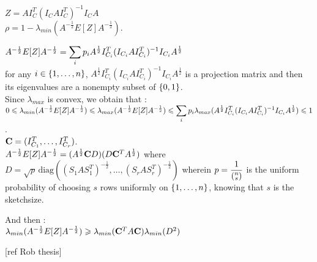 $Z = A I_{C}^{T} (I_{C} A I_{C}^{T})^{-1} I_{C} A$\\

$\rho = 1 - \lambda_{min}(A^{-\frac12}E[Z]A^{-\frac12}  )$.

$A^{-\frac12}E[Z]A^{-\frac12} = \dsp\sum\limits_{i} p_{i} A^{\frac 12} I_{C_{i}}^{T} (I_{C_{i}}  A  I_{C_{i}}^{T})^{-1} I_{C_{i}} A^{\frac 12}$ \\

for any $i \in \acco{1,\dots,n}$, $A^{\frac 12} I_{C_{i}}^{T} (I_{C_{i}}  A  I_{C_{i}}^{T})^{-1} I_{C_{i}} A^{\frac 12}$ is a projection matrix and then its eigenvalues are a nonempty subset of $\acco{0,1}$.\\

Since $\lambda_{max}$ is convex, we obtain that :\\

$0 \leq \lambda_{min}(A^{-\frac12}E[Z]A^{-\frac12}) \leq  \lambda_{max}(A^{-\frac12}E[Z]A^{-\frac12}) \leq \dsp\sum\limits_{i} p_{i} \lambda_{max}(A^{\frac 12} I_{C_{i}}^{T} (I_{C_{i}}  A  I_{C_{i}}^{T})^{-1} I_{C_{i}} A^{\frac 12}) \leq 1$.\\

$\bold{C} = (I_{C_{1}}^{T},\dots,I_{C_{r}}^{T})$.\\

$A^{-\frac12}E[Z]A^{-\frac12} = (A^{\frac 12} \bold{C} D)(D \bold{C}^{T} A^{\frac 12})$ where $D = \sqrt{p} \,\text{diag}( (S_{1}AS_{1}^{T})^{-\frac 12},\dots, (S_{r}AS_{r}^{T})^{-\frac 12})$ wherein $p = \dsp\frac{1}{\pare{\substack{ n \\ s }}}$ is the uniform probability of choosing $s$ rows uniformly on $\acco{1,\dots,n}$, knowing that $s$ is the sketchsize. \\



And then :\\
$\lambda_{min}(A^{-\frac12}E[Z]A^{-\frac12} ) \geq \lambda_{min}(\bold{C}^{T}A\bold{C} ) \lambda_{min}(D^{2})$

[ref Rob thesis] \\


